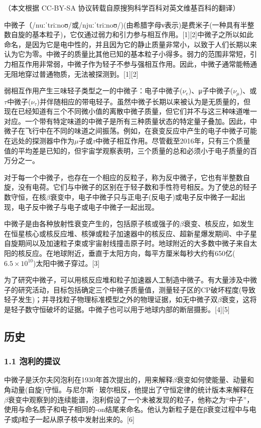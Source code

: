 
（本文根据 CC-BY-SA 协议转载自原搜狗科学百科对英文维基百科的翻译）

中微子（/nuːˈtriːnoʊ/或/njuːˈtriːnoʊ/)(由希腊字母ν表示)是费米子(一种具有半整数自旋的基本粒子)，它仅通过弱力和引力参与相互作用。[1][2]中微子之所以如此命名，是因为它是电中性的，并且因为它的静止质量非常小，以致于人们长期以来认为它为零。中微子的质量比其他已知的基本粒子小得多。弱力的范围非常短，引力相互作用非常弱，中微子作为轻子不参与强相互作用。因此，中微子通常能畅通无阻地穿过普通物质，无法被探测到。[1][2]

弱相互作用产生三味轻子类型之一的中微子：电子中微子($\nu_e$)、μ子中微子($\nu_\mu$)、或$\tau$中微子($\nu_\tau$)并伴随相应的带电轻子。虽然中微子长期以来被认为是无质量的，但现在已经知道有三个不同微小值的离散中微子质量，但它们并不与这三种味道唯一对应。一个带有特定味道的中微子是所有三种质量状态的特定量子叠加。因此，中微子在飞行中在不同的味道之间振荡。例如，在衰变反应中产生的电子中微子可能在远处的探测器中作为$\mu$子或$\tau$中微子相互作用。尽管截至2016年，只有三个质量值的平均差是已知的，但宇宙学观察表明，三个质量的总和必须小于电子质量的百万分之一。

对于每一个中微子，也存在一个相应的反粒子，称为反中微子，它也有半整数自旋，没有电荷。它们与中微子的区别在于轻子数和手性符号相反。为了使总的轻子数守恒，在核$\beta$衰变中，电子中微子只与正电子(反电子)或电子反中微子一起出现，电子反中微子与电子或电子中微子一起出现。

中微子是由各种放射性衰变产生的，包括原子核或强子的$\beta$衰变、核反应，如发生在恒星核心或核反应堆、核弹或粒子加速器中的核反应、超新星爆发期间、中子星自旋期间以及加速粒子束或宇宙射线撞击原子时。地球附近的大多数中微子来自太阳的核反应。在地球附近，垂直于太阳方向，每平方厘米每秒大约有650亿($6.5\times10^{10}$)太阳中微子穿过。[3]

为了研究中微子，可以用核反应堆和粒子加速器人工制造中微子。有大量涉及中微子的研究活动，目标包括确定三个中微子质量值，测量轻子区的CP破坏程度(导致轻子发生)；并寻找粒子物理标准模型之外的物理证据，如无中微子双$\beta$衰变，这将是轻子数守恒破坏的证据。中微子也可以用于地球内部的断层摄影。[4][5]

\subsection{历史}
\subsubsection{1.1 泡利的提议}
中微子是沃尔夫冈泡利在1930年首次提出的，用来解释$\beta$衰变如何使能量、动量和角动量(自旋)守恒。与尼尔斯·玻尔相反，他提出了守恒定律的统计版本来解释在$\beta$衰变中观察到的连续能谱，泡利假设了一个未被发现的粒子，他称之为“中子”，使用与命名质子和电子相同的-on结尾来命名。他认为新粒子是在β衰变过程中与电子或β粒子一起从原子核中发射出来的。[6]


